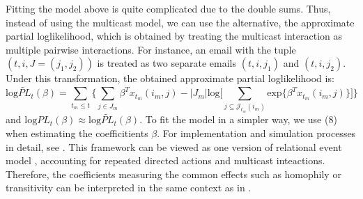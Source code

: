 \documentclass[a4paper]{article}
\begin{document}
Fitting the model above is quite complicated due to the double sums. Thus, instead of using the multicast model, we can use the alternative, the approximate partial loglikelihood, which is obtained by treating the multicast interaction as multiple pairwise interactions. For instance, an email with the tuple $(t, i, J=(j_1, j_2))$ is treated as two separate emails $(t, i, j_1)$ and $(t, i, j_2)$. Under this transformation, the obtained approximate partial loglikelihood is:\begin{equation}
\mbox{log}\widetilde{PL}_t(\beta)=\sum_{t_m\leq t} \Big\{\sum_{j\in J_m}\beta^Tx_{t_m}(i_m, j)-|J_m|\mbox{log}\big[\sum_{j\subseteq \mathcal{J}_{t_m}(i_m)}\mbox{exp}\{\beta^Tx_{t_m}(i_m, j)\}\big]\Big\}
\end{equation}
and $\mbox{log}PL_t(\beta)\approx \mbox{log}\widetilde{PL}_t(\beta)$. To fit the model in a simpler way, we use (8) when estimating the coefficitients $\beta$. For implementation and simulation processes in detail, see \cite{PerryWolfe2012}.  This framework can be viewed as one version of relational event model \cite{Butts2008}, accounting for repeated directed actions and multicast inteactions. Therefore, the coefficients measuring the common effects such as homophily or transitivity can be interpreted in the same context as in \cite{Butts2008}.
\end{document}
